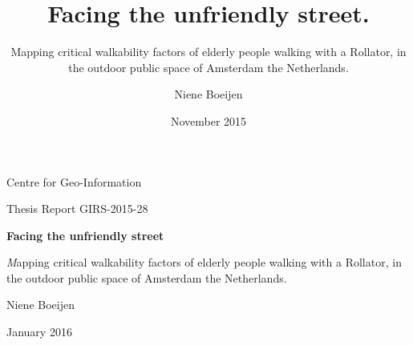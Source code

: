 \documentclass[10pt,a4paper, titlepage, onecolumn, openright, twoside, justified, parskip=full, fleqn, abstract, unicode=true, pdfencoding=auto,x11names, noindent, BCOR=-0.2mm, DIV=calc]{scrreprt}  %
\begin{document}
 
	

	\title{Facing the unfriendly street.}
	\subtitle{Mapping critical walkability factors of elderly people walking with a Rollator, in the outdoor public space of Amsterdam the Netherlands.}
	\date{November 2015}
	\author{Niene Boeijen}

	
	\begin{titlepage}
		\vspace*{-3cm}
		\Large Centre for Geo-Information \vspace*{0.5cm}
		
		\Large Thesis Report GIRS-2015-28

		\noindent\makebox[\linewidth]{\rule{\textwidth*2}{0.7pt}}
		\begin{center}
			\vspace*{3cm}
			\Huge \textbf{Facing the unfriendly street}

			\vspace{0.5cm}
			\LARGE\textit Mapping critical walkability factors of elderly people walking with a Rollator, in the outdoor public space of Amsterdam the Netherlands.
						
			\vspace{1.5cm}

			Niene Boeijen

			\vfill
			
			\Large January 2016
		\end{center}
	\end{titlepage}
\end{document}
